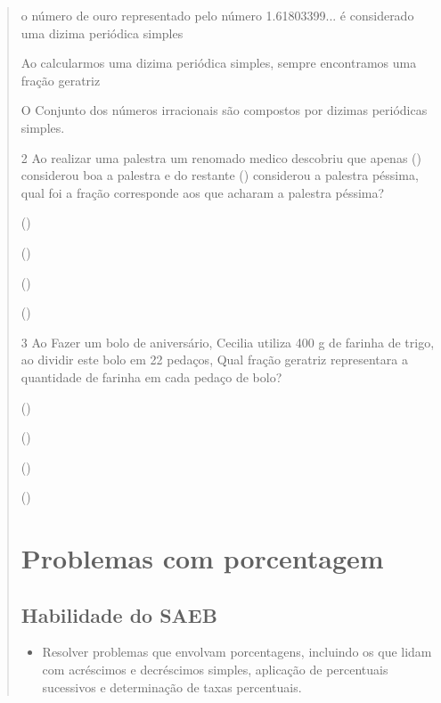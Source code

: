 \begin{quote}
\begin{escolha}
\item o número de ouro representado pelo número 1.61803399... é considerado
uma dizima periódica simples

\item Ao calcularmos uma dizima periódica simples, sempre encontramos uma
fração geratriz 

\item O Conjunto dos números irracionais são compostos por dizimas
periódicas simples.
\end{escolha}


\num{2} Ao realizar uma palestra um renomado medico descobriu que apenas
() considerou boa a palestra e do restante ()
considerou a palestra péssima, qual foi a fração corresponde aos que
acharam a palestra péssima?

\begin{escolha}
\item ()
\item ()
\item ()
\item () 
\end{escolha}


\num{3} Ao Fazer um bolo de aniversário, Cecilia utiliza 400 g de farinha de
trigo, ao dividir este bolo em 22 pedaços, Qual fração geratriz
representara a quantidade de farinha em cada pedaço de bolo?

\begin{escolha}
\item ()
\item ()
\item () 
\item ()



\chapter{Problemas com porcentagem}

\section{Habilidade do SAEB}

\begin{itemize}
\tightlist
\item
  Resolver problemas que envolvam porcentagens, incluindo os que lidam
  com acréscimos e decréscimos simples, aplicação de percentuais
  sucessivos e determinação de taxas percentuais.
\end{itemize}


\end{escolha}
\end{quote}

